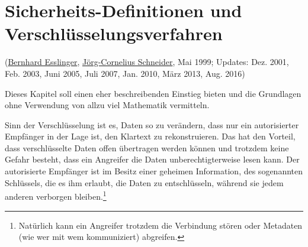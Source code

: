 
\begin{refsegment}


\hypertarget{Chapter_EncryptionSecDefinitions}{}

\chapter%
{Sicherheits-Definitionen und Verschlüsselungsverfahren}
\label{Chapter_EncryptionSecDefinitions}
(\hyperlink{author_Bernhard-Esslinger}{Bernhard Esslinger},
 \hyperlink{author_Joerg-Cornelius-Schneider}{Jörg-Cornelius Schneider},
 Mai 1999; Updates: Dez. 2001, Feb. 2003, Juni 2005, Juli 2007, Jan. 2010, März 2013, Aug. 2016)

Dieses Kapitel soll einen eher beschreibenden Einstieg bieten und die
Grundlagen ohne Verwendung von allzu viel Mathematik vermitteln.

Sinn der Verschlüsselung  ist es, Daten so zu
verändern, dass nur ein autorisierter Empfän\-ger in der Lage ist,
den Klartext zu rekonstruieren. Das hat den Vorteil, dass verschlüsselte
Daten offen übertragen werden können und trotzdem keine Gefahr besteht,
dass ein Angreifer die Daten unberechtigterweise lesen kann. Der
autorisierte Empfänger ist im Besitz einer geheimen Information, des
sogenannten Schlüssels, die es ihm erlaubt, die Daten zu entschlüsseln,
während sie jedem anderen verborgen bleiben.\footnote{%
  Natürlich kann ein Angreifer trotzdem die Verbindung stören oder
  Metadaten (wie wer mit wem kommuniziert) abgreifen.
}%


\end{refsegment}
